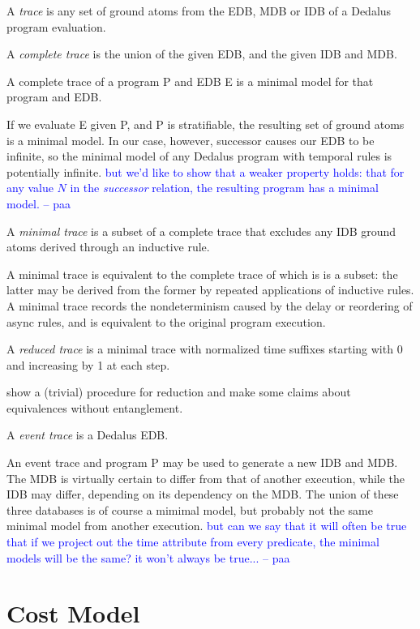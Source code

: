 \documentclass{acm_proc_article-sp-sigmod09}
\newcommand{\paa}[1]{{\textcolor{blue}{#1 -- paa}}}
\begin{document}
\begin{definition}
A \emph{trace} is any set of ground atoms from the EDB, MDB or IDB of a Dedalus program evaluation.
\end{definition}

\begin{definition}
A \emph{complete trace} is the union of the given EDB, and the given IDB and MDB.  
\end{definition}

\begin{lemma}
A complete trace of a program P and EDB E is a minimal model for that program and EDB.
\end{lemma}

If we evaluate E given P, and P is stratifiable, the resulting set of ground atoms is a minimal model.
In our case, however, successor causes our EDB to be infinite, so the minimal model of any Dedalus program 
with temporal rules is potentially infinite.  \paa{but we'd like to show that a weaker property holds: that for any value $N$
in the \emph{successor} relation, the resulting program has a minimal model.}

\begin{definition}
A \emph{minimal trace} is a subset of a complete trace that excludes any IDB ground atoms derived through an inductive
rule.
\end{definition}

A minimal trace is equivalent to the complete trace of which is is a subset: the latter may be derived from the former by repeated
applications of inductive rules.  A minimal trace records the nondeterminism caused by the delay or reordering of async rules, and
is equivalent to the original program execution.

\begin{definition}
A \emph{reduced trace} is a minimal trace with normalized time suffixes starting with 0 and increasing by 1 at each step.
\end{definition}

show a (trivial) procedure for reduction and make some claims about equivalences without entanglement.

\begin{definition}
A \emph{event trace} is a Dedalus EDB.
\end{definition}

An event trace and program P may be used to generate a new IDB and MDB.  The MDB is virtually certain to differ from that of another
execution, while the IDB may differ, depending on its dependency on the MDB.  The union of these three databases is of course a
mimimal model, but probably not the same minimal model from another execution.  \paa{but can we say that it will often be true that if we project 
out the time attribute from every predicate, the minimal models will be the same? it won't always be true...}

\section{Cost Model}
 
\end{document}
